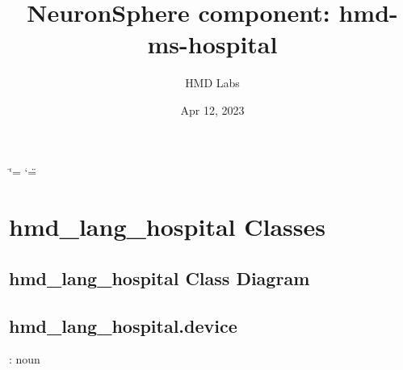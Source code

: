 \documentclass[letterpaper,10pt,english,openany,oneside]{sphinxmanual}
\title{NeuronSphere component: 
hmd-ms-hospital}
\date{Apr 12, 2023}
\author{HMD Labs}
\begin{document}
\ifdefined\shorthandoff
  \ifnum\catcode`\=\string=\active\shorthandoff{=}\fi
  \ifnum\catcode`\"=\active{}\fi
\fi

\pagestyle{empty}
\sphinxmaketitle
\pagestyle{plain}
\sphinxtableofcontents
\pagestyle{normal}
\label{\detokenize{index::doc}}


\sphinxstepscope


\chapter{hmd\_lang\_hospital Classes}
\label{\detokenize{classes/index:hmd-lang-hospital-classes}}\label{\detokenize{classes/index::doc}}
\sphinxstepscope


\section{hmd\_lang\_hospital Class Diagram}
\label{\detokenize{classes/class_diagram:hmd-lang-hospital-class-diagram}}\label{\detokenize{classes/class_diagram::doc}}
\noindent{}

\sphinxstepscope


\section{hmd\_lang\_hospital.device}
\label{\detokenize{classes/hmd_lang_hospital/device:hmd-lang-hospital-device}}\label{\detokenize{classes/hmd_lang_hospital/device::doc}}
\sphinxAtStartPar
{}: noun
\end{document}
